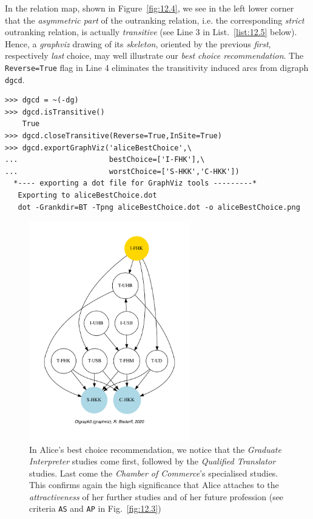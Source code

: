 In the relation map, shown in Figure~\vref{fig:12.4}, we see in the left lower corner that the \emph{asymmetric part} of the outranking relation, i.e. the corresponding \emph{strict} outranking relation, is actually \emph{transitive} (see Line 3 in List.~\vref{list:12.5} below). Hence, a \emph{graphviz} drawing of its \emph{skeleton}, oriented by the previous \emph{first}, respectively \emph{last} choice, may well illustrate our \emph{best choice recommendation}. The \texttt{Reverse=True} flag in Line 4 eliminates the transitivity induced arcs from digraph \texttt{dgcd}.
\begin{lstlisting}[caption={Alice's strict best choice recommendation},label=list:12.5]
>>> dgcd = ~(-dg)
>>> dgcd.isTransitive()
    True
>>> dgcd.closeTransitive(Reverse=True,InSite=True)
>>> dgcd.exportGraphViz('aliceBestChoice',\
...                     bestChoice=['I-FHK'],\
...                     worstChoice=['S-HKK','C-HKK'])
  *---- exporting a dot file for GraphViz tools ---------*
   Exporting to aliceBestChoice.dot
   dot -Grankdir=BT -Tpng aliceBestChoice.dot -o aliceBestChoice.png
\end{lstlisting}
\begin{figure}[ht]
\sidecaption[t]
\includegraphics[width=7cm]{Figures/12-5-aliceBestChoice.pdf}
\caption[Alice's best choice recommendation]{In Alice's best choice recommendation, we notice that the \emph{Graduate Interpreter} studies come first, followed by the \emph{Qualified Translator} studies. Last come the \emph{Chamber of Commerce}'s specialised studies. This confirms again the high significance that Alice attaches to the \emph{attractiveness} of her further studies and of her future profession (see criteria \texttt{AS} and \texttt{AP} in Fig.~\vref{fig:12.3})}
\label{fig:12.5}       %
\end{figure}

